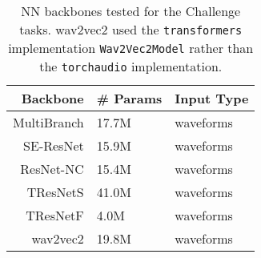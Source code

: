 
\begin{table}[!htp]
\centering
\begin{tabular}{r|l|l}
    \hline
    Backbone & \# Params & Input Type \\ \hline
    MultiBranch \cite{Kang_2022_cinc2021_iop} & 17.7M & waveforms \\
    SE-ResNet \cite{Kang_2022_cinc2021_iop} & 15.9M & waveforms  \\
    ResNet-NC \cite{ribeiro2020automatic} & 15.4M & waveforms  \\
    TResNetS \cite{Kang_2022_cinc2021_iop} & 41.0M & waveforms  \\
    TResNetF \cite{Kang_2022_cinc2021_iop} & 4.0M & waveforms  \\
    wav2vec2 \cite{baevski2020wav2vec} & 19.8M & waveforms \\ \hline
\end{tabular}
\caption{NN backbones tested for the Challenge tasks. wav2vec2 used the \texttt{transformers} implementation \texttt{Wav2Vec2Model} rather than the \texttt{torchaudio} implementation.}
\label{tab:nn_backbone}
\end{table}
